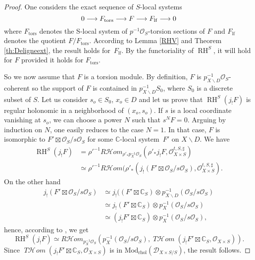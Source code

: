 \documentclass[english]{smfart}
\numberwithin{subsection}{section}
\def\shd{\mathcal{D}}\let\cD\shd
\def\sho{\mathcal{O}}\let\cO\sho
\newcommand{\C}{\mathbb{C}}\let\CC\C
\newcommand{\Rhom}{R\shhom}
\newcommand{\shhom}{\mathcal{H}\!\mathit{om}}\let\ho\shhom
\DeclareMathOperator{\tho}{\mathit{T}\shhom}
\DeclareMathOperator{\RH}{RH}
\newcommand{\rhol}{\mathrm{rhol}}
\newcommand{\Mod}{\mathrm{Mod}}
\newcommand{\tors}{\mathrm{tors}}
\newcommand{\lf}{\mathrm{lf}}
\newcommand{\XS}{X\times S}
\newcommand{\DXS}{\shd_{\XS/S}}
\let\setminus\smallsetminus
\newcommand{\pOS}{p^{-1}\sho_S}
\numberwithin{equation}{section}
\theoremstyle{plain}
\theoremstyle{definition}
\def\to{\mathchoice{\longrightarrow}{\rightarrow}{\rightarrow}{\rightarrow}}
\begin{document}
\begin{proof}
One considers the exact sequence of $S$-local systems
$$0\to F_\tors\to F\to F_\lf\to 0$$
where $F_\tors$ denotes the S-local system of $\pOS$-torsion sections of $F$ and $F_\lf$ denotes the quotient $F/F_\tors$. According to Lemma \ref{RHV} and Theorem \ref{th:Deligneext}, the result holds for~$F_\lf$. By the functoriality of $\RH^S$, it will hold for $F$ provided it holds for $F_\tors$.

So we now assume that $F$ is a torsion module. By definition, $F$ is $p^{-1}_{X\setminus D}\sho_S$-coherent so the support of $F$ is contained in $p^{-1}_{X\setminus D} S_0$, where $S_0$ is a discrete subset of $S$. Let us consider $s_o\in S_0$, $x_o\in D$ and let us prove that $\RH^S(j_!F)$ is regular holonomic in a neighborhood of $(x_o,s_o)$. If $s$ is a local coordinate vanishing at $s_o$, we can choose a power $N$ such that $s^NF=0$. Arguing by induction on $N$, one easily reduces to the case $N=1$. In that case, $F$ is isomorphic to $F'\boxtimes \sho_S/s\sho_S $ for some $\C$-local system~$F'$ on $X\setminus D$. We have
\begin{align*}
\RH^S(j_!F)&=\rho'^{-1}\Rhom_{\rho'_*{p^{-1}_{X}\sho_S}}(\rho'_*j_!F, \sho^{t,S,\sharp}_{\XS})\\
&\simeq \rho'^{-1}\Rhom(\rho'_*(j_!(F'\boxtimes \sho_S/s\sho_S), \sho^{t,S,\sharp}_{\XS}).
\end{align*}
On the other hand
\begin{align*}
j_!(F'\boxtimes \sho_S/s\sho_S)&\simeq j_!((F'\boxtimes\CC_S)\otimes p^{-1}_{X\setminus D}(\sho_S/s\sho_S)\\
&\simeq j_!(F'\boxtimes\CC_S)\otimes p^{-1}_{X}(\sho_S/s\sho_S)\\
&\simeq (j_!F'\boxtimes\CC_S)\otimes p^{-1}_{X}(\sho_S/s\sho_S),
\end{align*}
hence, according to \cite[Prop.\,4.7(1)]{MF-P14}, we get
$$\RH^S(j_!F)\simeq \Rhom_{p^{-1}_{X}\sho_S}(p^{-1}_{X}(\sho_S/s\sho_S),\tho(j_!F'\boxtimes \CC_{S},\sho_{\XS})).$$
Since $\tho(j_!F'\boxtimes \CC_{S},\sho_{\XS})$ is in $\Mod_\rhol(\DXS)$, the result follows.
\end{proof}
\end{document}
